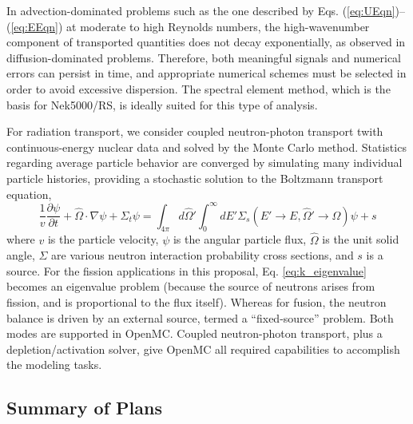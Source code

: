 In advection-dominated problems such as the one described by
Eqs. (\ref{eq:UEqn})--(\ref{eq:EEqn}) at moderate to high Reynolds numbers, the
high-wavenumber component of transported quantities does not decay
exponentially, as observed in diffusion-dominated problems. Therefore, both
meaningful signals and numerical errors can persist in time, and appropriate
numerical schemes must be selected in order to avoid excessive dispersion.
The spectral element method, which is the basis for Nek5000/RS, is ideally
suited for this type of analysis. %

For radiation transport, we consider coupled neutron-photon transport twith continuous-energy nuclear data and solved by the Monte Carlo method.
Statistics regarding average particle behavior are converged by simulating many individual particle histories,
providing a stochastic solution to the Boltzmann transport equation,
\begin{equation}
\label{eq:k_eigenvalue}
\frac{1}{v}\frac{\partial\psi}{\partial t}+\hat{\Omega}\cdot\nabla\psi+\Sigma_t\psi=\int_{4\pi}d\hat{\Omega}' \int_{0}^\infty  dE'\Sigma_s(E'\rightarrow E, \hat{\Omega}'\rightarrow\hat{\Omega})\psi+s
\end{equation}
where $v$ is the particle velocity, $\psi$ is the angular particle flux, $\hat{\Omega}$ is the unit solid angle, $\Sigma$ are various neutron interaction
probability cross sections, and $s$ is a source. For the fission applications in this proposal, Eq. 
\ref{eq:k_eigenvalue} becomes an eigenvalue problem (because the source of neutrons arises from fission,
and is proportional to the flux itself). Whereas for fusion, the neutron balance is driven by an external source,
termed a ``fixed-source'' problem.
Both modes are supported in OpenMC. Coupled neutron-photon transport, plus a depletion/activation
solver, give OpenMC all required capabilities to accomplish the modeling tasks.

\subsection{Summary of Plans}


